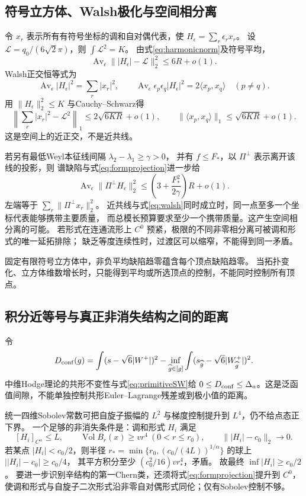 \documentclass[UTF8,a4paper,11pt,fontset=fandol]{ctexart}
\numberwithin{equation}{section}
\theoremstyle{definition}
\newcommand{\Vol}{\operatorname{Vol}}
\begin{document}
\subsection{符号立方体、Walsh极化与空间相分离}
令 $x_r$ 表示所有有符号坐标的调和自对偶代表，使
$H_\epsilon=\sum_r\epsilon_rx_r$。
设 $\mathcal L=q_0/(6\sqrt2\pi)$，则 $\int\mathcal L^2=K$。
由式\eqref{eq:harmonicnorm}及符号平均，
\[
\operatorname{Av}_\epsilon\||H_\epsilon|-\mathcal L\|_2^2\le6R+o(1).
\]
Walsh正交恒等式为
\[
\operatorname{Av}_\epsilon|H_\epsilon|^2=\sum_r|x_r|^2,\qquad
\operatorname{Av}_\epsilon\epsilon_p\epsilon_q|H_\epsilon|^2
=2\langle x_p,x_q\rangle\quad(p\ne q).
\]
用 $\|H_\epsilon\|_2^2\le K$ 与Cauchy--Schwarz得
\begin{equation}\label{eq:walsh}
\left\|\sum_r|x_r|^2-\mathcal L^2\right\|_1\le2\sqrt{6KR}+o(1),\qquad
\|\langle x_p,x_q\rangle\|_1\le\sqrt{6KR}+o(1).
\end{equation}
这是空间上的近正交，不是近共线。

若另有最低Weyl本征线间隔 $\lambda_2-\lambda_1\ge\gamma>0$，
并有 $f\le F_*$，以 $\Pi^\perp$ 表示离开该线的投影，则
谱缺陷与式\eqref{eq:formprojection}进一步给
\[
\operatorname{Av}_\epsilon\|\Pi^\perp H_\epsilon\|_2^2
\le\left(3+\frac{F_*^2}{2\gamma}\right)R+o(1).
\]
左端等于 $\sum_r\|\Pi^\perp x_r\|_2^2$。
近共线与式\eqref{eq:walsh}同时成立时，同一点至多一个坐标代表能够携带主要质量，
而总模长预算要求至少一个携带质量。这产生空间相分离的可能。
若形式在连通流形上 $C^0$ 预紧，极限的不同非零相分离可被调和形式的唯一延拓排除；
缺乏等度连续性时，过渡区可以缩窄，不能得到同一矛盾。

固定有限符号立方体中，非负平均缺陷趋零蕴含每个顶点缺陷趋零。
当拓扑变化、立方体维数增长时，只能得到平均或所选顶点的控制，不能同时控制所有顶点。

\subsection{积分近等号与真正非消失结构之间的距离}
令
\[
D_{\rm conf}(g)=\int(s-\sqrt6|W^+|)^2
-\inf_{\widehat g\in[g]}\int(s_{\widehat g}-\sqrt6|W^+_{\widehat g}|)^2.
\]
中维Hodge理论的共形不变性与式\eqref{eq:primitiveSW}给
$0\le D_{\rm conf}\le\Delta_a$。这是泛函值间隙，不能单独控制共形Euler--Lagrange残差或到极小值的距离。

统一四维Sobolev常数可把自旋子振幅的 $L^2$ 与梯度控制提升到 $L^4$，仍不给点态正下界。
一个足够的非消失条件是：调和形式 $H_i$ 满足
\[
[H_i]_{C^\alpha}\le L,\qquad
\Vol B_r(x)\ge vr^4\ (0<r\le r_0),\qquad
\||H_i|-c_0\|_2\to0.
\]
若某点 $|H_i|<c_0/2$，则半径
$r_*=\min\{r_0,(c_0/(4L))^{1/\alpha}\}$ 的球上
$\bigl||H_i|-c_0\bigr|\ge c_0/4$，
其平方积分至少 $(c_0^2/16)vr_*^4$，矛盾。
故最终 $\inf|H_i|\ge c_0/2$。
要进一步识别辛结构的第一Chern类，还须将式\eqref{eq:formprojection}提升到 $C^0$，使调和形式与自旋子二次形式沿非零自对偶形式同伦；仅有Sobolev控制不够。
\end{document}

